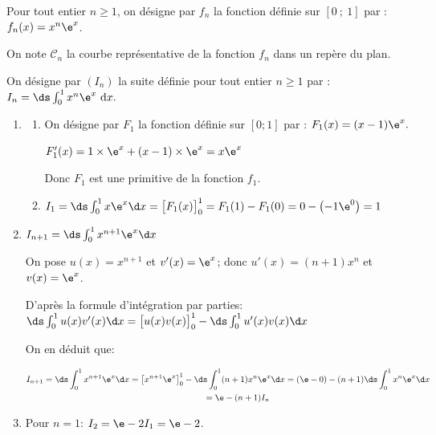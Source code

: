 \medskip


\medskip

Pour tout entier $n\geqslant 1$, on désigne par $f_{n}$ la fonction définie sur $[0~;~1]$ par :
$f_{n}(x) = x^{n} \e^{x}$.

On note $\mathcal{C}_{n}$ la courbe représentative de la fonction $f_{n}$ dans un repère \Oij{} du plan.

On désigne par $\left(I_{n}\right)$ la suite définie pour tout entier $n\geqslant 1$ par :
$I_{n} =\ds \int_{0}^{1} x^{n} \e^{x} \mathrm{~d} x.$

\begin{enumerate}
\item 
	\begin{enumerate}
		\item On désigne par $F_{1}$ la fonction définie sur $[0 ; 1]$ par : $F_{1}(x) = (x-1) \e^{x}.$

$F'_1(x)=1\times \e^{x} + (x-1)\times \e^{x} = x\e^{x}$

Donc $F_{1}$ est une primitive de la fonction $f_{1}$.

		\item $I_{1} = \ds \int_{0}^{1} x \e^{x} \d x = \left [ F_1(x)\strut\right ]_{0}^{1}= F_1(1)-F_1(0) = 0- \left (-1\e^{0}\right )=1$
		
	\end{enumerate}
	
\item 
$I_{n+1}=\ds\int_{0}^{1} x^{n+1}\e^{x}\d x$

On pose $u(x)=x^{n+1}$ et $v'(x)=\e^{x}$; donc $u'(x)=(n+1)x^n$ et $v(x)=\e^{x}$.

D'après la formule d'intégration par parties:\\
$\ds\int_{0}^{1} u(x)v'(x) \d x =  \left [ u(x)v(x)\strut \right ]_{0}^{1} - \ds\int_{0}^{1} u'(x)v(x)\d x$

On en déduit que:

$\begin{gathered}I_{n+1}=\ds\int_{0}^{1} x^{n+1}\e^{x} \d x =  \left [ x^{n+1}\e^{x}\strut \right ]_{0}^{1} - \ds\int_{0}^{1} (n+1)x^n \e^{x}\d x
= (\e - 0) - (n+1) \ds\int_{0}^{1} x^n \e^{x} \d x\\
\phantom{I_{n+1}}
= \e -(n+1) I_{n}\end{gathered}$

\item Pour $n=1$: $I_{2} = \e - 2I_1= \e-2$.


\end{enumerate}

